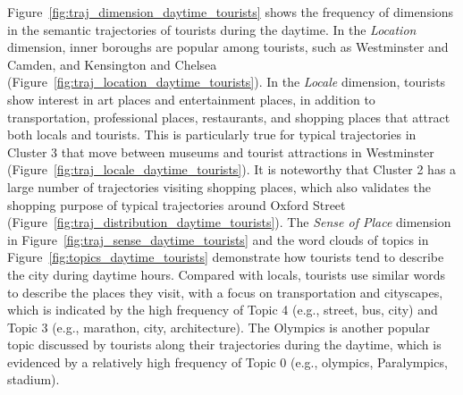 \documentclass{article}
\theoremstyle{remark}
\begin{document}
Figure~\ref{fig:traj_dimension_daytime_tourists} shows the frequency of dimensions in the semantic trajectories of tourists during the daytime. In the \textit{Location} dimension, inner boroughs are popular among tourists, such as Westminster and Camden, and Kensington and Chelsea (Figure~\ref{fig:traj_location_daytime_tourists}). In the \textit{Locale} dimension, tourists show interest in art places and entertainment places, in addition to transportation, professional places, restaurants, and shopping places that attract both locals and tourists. This is particularly true for typical trajectories in Cluster 3 that move between museums and tourist attractions in Westminster (Figure~\ref{fig:traj_locale_daytime_tourists}). It is noteworthy that Cluster 2 has a large number of trajectories visiting shopping places, which also validates the shopping purpose of typical trajectories around Oxford Street (Figure~\ref{fig:traj_distribution_daytime_tourists}). The \textit{Sense of Place} dimension in Figure~\ref{fig:traj_sense_daytime_tourists} and the word clouds of topics in Figure~\ref{fig:topics_daytime_tourists} demonstrate how tourists tend to describe the city during daytime hours. Compared with locals, tourists use similar words to describe the places they visit, with a focus on transportation and cityscapes, which is indicated by the high frequency of Topic 4 (e.g., street, bus, city) and Topic 3 (e.g., marathon, city, architecture). The Olympics is another popular topic discussed by tourists along their trajectories during the daytime, which is evidenced by a relatively high frequency of Topic 0 (e.g., olympics, Paralympics, stadium).
\end{document}
